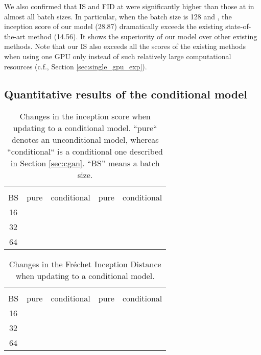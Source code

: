 \documentclass[twocolumn]{svjour3}
\def\Sec#1{Section \ref{sec:#1}}
\begin{document}
We also confirmed that IS and FID at  were significantly
higher than those at  in almost all batch sizes.
In particular, when the batch size is 128 and ,
the inception score of our model (28.87) dramatically exceeds
the existing state-of-the-art method (14.56).
It shows the superiority of our model over other existing methods.
Note that our IS also exceeds all the scores of the existing methods
when using one GPU only instead of
such relatively large computational resources
(c.f., \Sec{single_gpu_exp}).

\subsection{Quantitative results of the conditional model}
\begin{table}
\centering
{\renewcommand{\arraystretch}{1.2}
\begin{tabular}{c|cc|cc}
& \multicolumn{2}{|c|}{} & \multicolumn{2}{|c}{} \\ \cline{2-5}
BS & pure & conditional & pure & conditional \\ \hline \hline
16 & {} & {} &  & {} \\
32 & {} & {} &  & {} \\
64 & {} & {} &  & {} \\ \hline
\end{tabular}
}
\caption{Changes in the inception score when updating to a conditional model. ``pure`` denotes an unconditional model, whereas ``conditional`` is a conditional one described in \Sec{cgan}. ``BS'' means a batch size.}
\label{table:cond_is}
\end{table}

\begin{table}
\centering
{\renewcommand{\arraystretch}{1.2}
\begin{tabular}{c|cc|cc}
& \multicolumn{2}{|c|}{} & \multicolumn{2}{|c}{} \\ \cline{2-5}
BS & pure & conditional & pure & conditional \\ \hline \hline
16 & {} & {} &  & {} \\
32 & {} & {} &  & {} \\
64 &  & {} &  & {} \\ \hline
\end{tabular}
}
\caption{Changes in the Fr\'echet Inception Distance when updating to a conditional model.}
\label{table:cond_fid}
\end{table}
\end{document}
